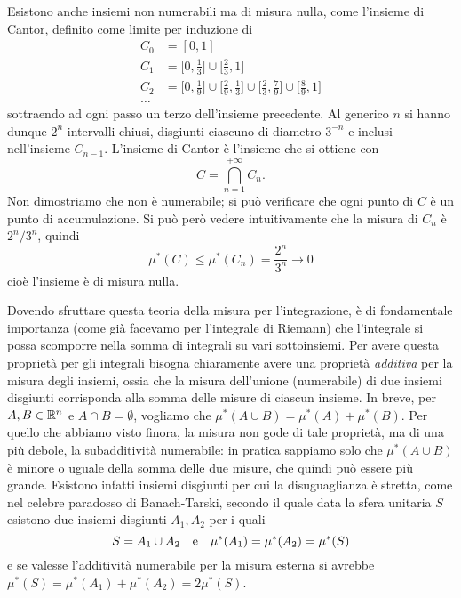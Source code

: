 Esistono anche insiemi non numerabili ma di misura nulla, come l'insieme di Cantor, definito come limite per induzione di
\begin{equation}
	\begin{aligned}
		C_0&=[0,1]\\
		C_1&=\Big[0,\frac13\Big]\cup\Big[\frac23,1\Big]\\
		C_2&=\Big[0,\frac19\Big]\cup\Big[\frac29,\frac13\Big]\cup\Big[\frac23,\frac79\Big]\cup\Big[\frac89,1\Big]\\
		\dots
	\end{aligned}
\end{equation}
sottraendo ad ogni passo un terzo dell'insieme precedente.
Al generico $n$ si hanno dunque $2^n$ intervalli chiusi, disgiunti ciascuno di diametro $3^{-n}$ e inclusi nell'insieme $C_{n-1}$.
L'insieme di Cantor è l'insieme che si ottiene con
\begin{equation}
	C=\bigcap_{n=1}^{+\infty}C_n.
\end{equation}
Non dimostriamo che non è numerabile; si può verificare che ogni punto di $C$ è un punto di accumulazione.
Si può però vedere intuitivamente che la misura di $C_n$ è $2^n/3^n$, quindi
\begin{equation}
	\mu^*(C)\leq\mu^*(C_n)=\frac{2^n}{3^n}\to 0
\end{equation}
cioè l'insieme è di misura nulla.

Dovendo sfruttare questa teoria della misura per l'integrazione, è di fondamentale importanza (come già facevamo per l'integrale di Riemann) che l'integrale si possa scomporre nella somma di integrali su vari sottoinsiemi.
Per avere questa proprietà per gli integrali bisogna chiaramente avere una proprietà \emph{additiva} per la misura degli insiemi, ossia che la misura dell'unione (numerabile) di due insiemi disgiunti corrisponda alla somma delle misure di ciascun insieme.
In breve, per $A,B\in\mathbb{R}^n$ e $A\cap B=\emptyset$, vogliamo che $\mu^*(A\cup B)=\mu^*(A)+\mu^*(B)$.
Per quello che abbiamo visto finora, la misura non gode di tale proprietà, ma di una più debole, la subadditività numerabile: in pratica sappiamo solo che $\mu^*(A\cup B)$ è minore o uguale della somma delle due misure, che quindi può essere più grande.
Esistono infatti insiemi disgiunti per cui la disuguaglianza è stretta, come nel celebre paradosso di Banach-Tarski, secondo il quale data la sfera unitaria $S$ esistono due insiemi disgiunti $A_1,A_2$ per i quali
\begin{equation}
	S=A_1\cup A_2\quad\text{e}\quad \mu^*(A_1)=\mu^*(A_2)=\mu^*(S) 
\end{equation}
e se valesse l'additività numerabile per la misura esterna si avrebbe $\mu^*(S)=\mu^*(A_1)+\mu^*(A_2)=2\mu^*(S)$.

